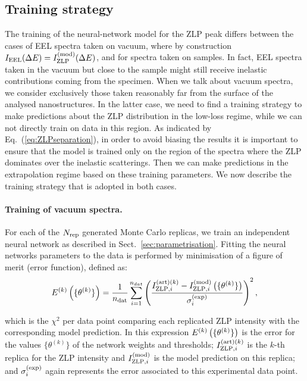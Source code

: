 \subsection{Training strategy}
\label{sec:training}

The training of the neural-network model for the ZLP peak differs between
the cases of EEL spectra taken on vacuum,
where by construction $I_{\rm EEL}(\Delta E) =I_{\rm ZLP}^{\rm (mod)}(\Delta E)$,
and for spectra taken on samples. 
%
In fact, EEL spectra taken in the vacuum but close
to the sample might still receive inelastic contributions coming from the specimen.
%
When we talk about vacuum spectra, we consider exclusively those taken 
reasonably far from the surface of the analysed nanostructures.
%
In the latter case, we need to find a training strategy to make predictions
about the ZLP distribution in the low-loss regime, while we can not directly
train on data in this region.
%
As indicated by Eq.~(\ref{eq:ZLPseparation}), in order to avoid
biasing the results it is important to ensure that the model is trained only on the region of the spectra
where the ZLP dominates over the inelastic scatterings.
%
Then we can make predictions in the extrapolation regime based on these 
training parameters.
%
We now describe the training strategy that is adopted in both cases.

\paragraph{Training of vacuum spectra.}
%
For each of the $N_{\rm rep}$ generated Monte Carlo replicas, we train an independent
neural network as described in Sect.~\ref{sec:parametrisation}.
%
Fitting the neural networks parameters to the data is performed by minimisation of a
figure of merit (error function), defined as:
\begin{equation}
  \label{eq:chi2}
\begin{centering}
  E^{(k)}\lp \{\theta^{(k)}\}\rp = \frac{1}{n_{\rm dat}}\sum_{i=1}^{n_{dat}}\left(\frac{ I_{{\rm ZLP},i}^{{\rm (art)}(k)} -
  I_{{\rm ZLP},i}^{{\rm (mod)}}\lp \{\theta^{(k)}\}\rp }{\sigma_i^{(\rm exp)}}\right)^2, 
\end{centering}
\end{equation}

which is the $\chi^2$ per data point comparing each replicated ZLP intensity
with the corresponding model prediction.
%
In this expression $E^{(k)}\left( \{\theta^{(k)}\}\right)$ is the error for the values 
$\{\theta^{(k)}\}$ of the network weights and thresholds;
$I_{{\rm ZLP},i}^{{\rm (art)}(k)}$ is the $k$-th replica for the ZLP 
intensity and $I_{{\rm ZLP},i}^{{\rm (mod)}}$ is the model prediction on this
replica; and ${\sigma_i^{(\rm exp)}}$ again represents the error
associated to this experimental data point.\\


